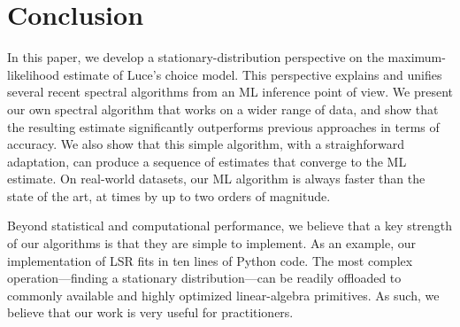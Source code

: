 \section{Conclusion}
\label{fi:sec:conclusion}

In this paper, we develop a stationary-distribution perspective on the maximum-likelihood estimate of Luce's choice model.
This perspective explains and unifies several recent spectral algorithms from an ML inference point of view.
We present our own spectral algorithm that works on a wider range of data, and show that the resulting estimate significantly outperforms previous approaches in terms of accuracy.
We also show that this simple algorithm, with a straighforward adaptation, can produce a sequence of estimates that converge to the ML estimate.
On real-world datasets, our ML algorithm is always faster than the state of the art, at times by up to two orders of magnitude.

Beyond statistical and computational performance, we believe that a key strength of our algorithms is that they are simple to implement.
As an example, our implementation of LSR fits in ten lines of Python code.
The most complex operation---finding a stationary distribution---can be readily offloaded to commonly available and highly optimized linear-algebra primitives.
As such, we believe that our work is very useful for practitioners.
